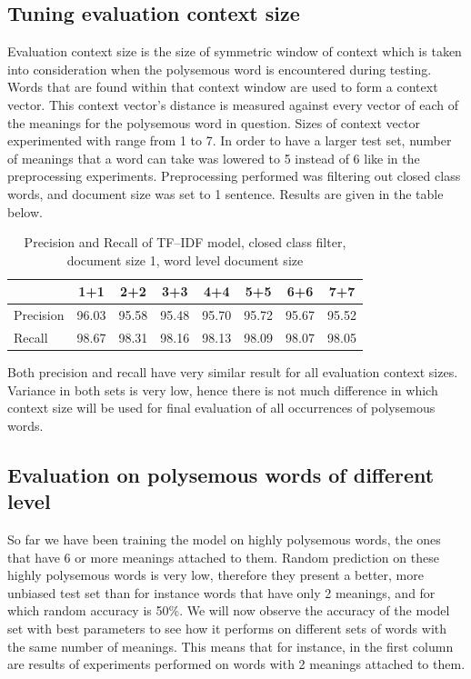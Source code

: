 \subsection{Tuning evaluation context size}
Evaluation context size is the size of symmetric window of context which is taken into consideration 
when the polysemous word is encountered during testing. Words that are found within that context
window are used to form a context vector. This context vector's distance is measured against every
vector of each  of the meanings for the polysemous word in question. Sizes of context vector 
experimented with range from 1 to 7. In order to have a larger test set, number of meanings that 
a word can take was lowered to 5 instead of 6 like in the preprocessing experiments. Preprocessing
performed was filtering out closed class words, and document size was set to 1 sentence. 
Results are given 
in the table below. 

\begin{table}[h!]
\begin{tabular}{ l | c c c c c c c}
    &  1+1 & 2+2 & 3+3 & 4+4 & 5+5 & 6+6 & 7+7 \\
\hline
Precision &96.03 &95.58   & 95.48  &  95.70 & 95.72  & 95.67  & 95.52  \\
\hline
Recall  & 98.67 & 98.31  & 98.16  & 98.13  & 98.09  & 98.07  &  98.05 \\
\end{tabular}
\caption{Precision and Recall of TF--IDF model, closed class filter, document size 1, word level document size}
\end{table} 

Both precision and recall have very similar result for all evaluation context sizes. Variance in both sets 
is very low, hence there is not much difference in which context size will be used for final evaluation
of all occurrences of polysemous words.


\subsection{ Evaluation on polysemous words of different level}
So far we have been training the model on highly polysemous words, the ones that have 6 or more 
meanings attached to them. Random prediction on these highly polysemous words is very low, therefore
they present a better, more unbiased test set than for instance words that have only 2 meanings, and 
for which random accuracy is 50\%. We will now observe the accuracy of the model set with best
parameters to see how it performs on different sets of words with the same number of meanings. This means
that for instance, in the first column are results of experiments performed on words with 2 meanings attached to them.

